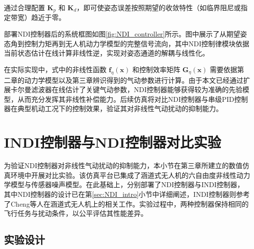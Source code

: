 通过合理配置 \(\boldsymbol{K}_p\) 和 \(\boldsymbol{K}_d\)，即可使姿态误差按照期望的收敛特性（如临界阻尼或指定带宽）趋近于零。

部署NDI控制器后的系统框图如图\ref{fig:NDI_controller}所示。图中展示了从期望姿态角到控制力矩再到无人机动力学模型的完整信号流向，其中NDI控制律模块依据当前状态估计在线计算非线性逆，实现对姿态通道的解耦与线性化。

在实际实现中，式中的非线性函数 \(\boldsymbol{f}_{\eta}(\boldsymbol{x})\) 和控制效率矩阵 \(\boldsymbol{G}_{\eta}(\boldsymbol{x})\) 需要依据第二章的动力学模型以及第三章辨识得到的气动参数进行计算。由于本文已经通过扩展卡尔曼滤波器在线估计了关键气动参数，NDI控制器能够获得较为准确的先验模型，从而充分发挥其非线性补偿能力。后续仿真将对比NDI控制器与串级PID控制器在典型机动工况下的控制效果，验证其对非线性气动扰动的抑制能力。



\section{INDI控制器与NDI控制器对比实验}

为验证NDI控制器对非线性气动扰动的抑制能力，本小节在第三章所建立的数值仿真环境中开展对比实验。该仿真平台已集成了涵道式无人机的六自由度非线性动力学模型与传感器噪声模型。在此基础上，分别部署了NDI控制器与INDI控制器，其中NDI控制器的设计已在第\ref{sec:NDI_intro}小节中详细阐述，INDI控制器则参考了Cheng等人在涵道式无人机上的相关工作\cite{Cheng2024INDI}。实验过程中，两种控制器保持相同的飞行任务与扰动条件，以公平评估其性能差异。

\subsection{实验设计}

